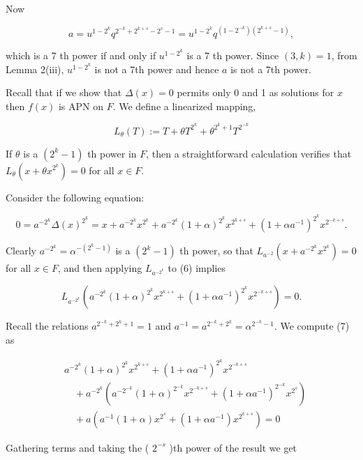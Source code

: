 \documentclass[10pt]{article}
\begin{document}
Now

$$
a=u^{1-2^{k}} q^{2^{-k}+2^{k+s}-2^{s}-1}=u^{1-2^{k}} q^{\left(1-2^{-k}\right)\left(2^{k+s}-1\right)},
$$

which is a 7 th power if and only if $u^{1-2^{k}}$ is a 7 th power. Since $(3, k)=1$, from Lemma 2(iii), $u^{1-2^{k}}$ is not a 7th power and hence $a$ is not a 7th power.

Recall that if we show that $\Delta(x)=0$ permits only 0 and 1 as solutions for $x$ then $f(x)$ is APN on $F$. We define a linearized mapping,

$$
L_{\theta}(T):=T+\theta T^{2^{k}}+\theta^{2^{k}+1} T^{2^{-k}}
$$

If $\theta$ is a $\left(2^{k}-1\right)$ th power in $F$, then a straightforward calculation verifies that $L_{\theta}\left(x+\theta x^{2^{k}}\right)=0$ for all $x \in F$.

Consider the following equation:


\begin{equation*}
0=a^{-2^{k}} \Delta(x)^{2^{k}}=x+a^{-2^{k}} x^{2^{k}}+a^{-2^{k}}(1+\alpha)^{2^{k}} x^{2^{k+s}}+\left(1+\alpha a^{-1}\right)^{2^{k}} x^{2^{-k+s}} . \tag{6}
\end{equation*}


Clearly $a^{-2^{k}}=\alpha^{-\left(2^{k}-1\right)}$ is a $\left(2^{k}-1\right)$ th power, so that $L_{a^{-2}}\left(x+a^{-2^{k}} x^{2^{k}}\right)=0$ for all $x \in F$, and then applying $L_{a^{-2^{k}}}$ to (6) implies


\begin{equation*}
L_{a^{-2^{k}}}\left(a^{-2^{k}}(1+\alpha)^{2^{k}} x^{2^{k+s}}+\left(1+\alpha a^{-1}\right)^{2^{k}} x^{2^{-k+s}}\right)=0 . \tag{7}
\end{equation*}


Recall the relations $a^{2^{-k}+2^{k}+1}=1$ and $a^{-1}=a^{2^{-k}+2^{k}}=\alpha^{2^{-k}-1}$. We compute (7) as

$$
\begin{aligned}
& a^{-2^{k}}(1+\alpha)^{2^{k}} x^{2^{k+s}}+\left(1+\alpha a^{-1}\right)^{2^{k}} x^{2^{-k+s}} \\
& \quad+a^{-2^{k}}\left(a^{-2^{-k}}(1+\alpha)^{2^{-k}} x^{2^{-k+s}}+\left(1+\alpha a^{-1}\right)^{2^{-k}} x^{2^{s}}\right) \\
& \quad+a\left(a^{-1}(1+\alpha) x^{2^{s}}+\left(1+\alpha a^{-1}\right) x^{2^{k+s}}\right)=0
\end{aligned}
$$

Gathering terms and taking the ( $2^{-s}$ )th power of the result we get
\end{document}
